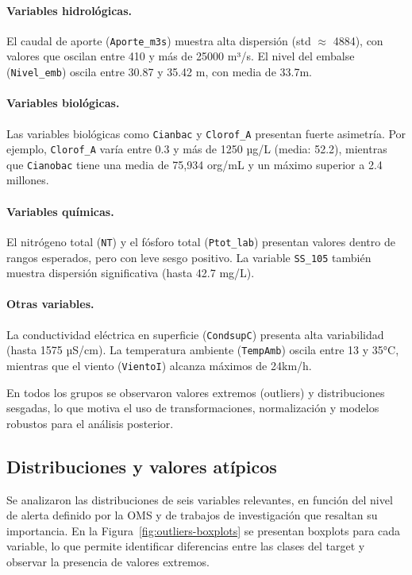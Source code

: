 \documentclass[
  11pt,
  pdftitle=TFI - Tschopp Joaquín S.,
  pdfauthor=Tschopp Joaquín S.,
  pdfcreator=LaTeX with hyperref,
]{report}  %
\begin{document}
\paragraph{Variables hidrológicas.}
El caudal de aporte (\texttt{Aporte\_m3s}) muestra alta dispersión (std $\approx$ 4884), con valores que oscilan entre 410 y más de 25000 m³/s. El nivel del embalse (\texttt{Nivel\_emb}) oscila entre 30.87 y 35.42 m, con media de 33.7m.

\paragraph{Variables biológicas.}
Las variables biológicas como \texttt{Cianbac} y \texttt{Clorof\_A} presentan fuerte asimetría. Por ejemplo, \texttt{Clorof\_A} varía entre 0.3 y más de 1250 µg/L (media: 52.2), mientras que \texttt{Cianobac} tiene una media de 75,934 org/mL y un máximo superior a 2.4 millones.

\paragraph{Variables químicas.}
El nitrógeno total (\texttt{NT}) y el fósforo total (\texttt{Ptot\_lab}) presentan valores dentro de rangos esperados, pero con leve sesgo positivo. La variable \texttt{SS\_105} también muestra dispersión significativa (hasta 42.7 mg/L).

\paragraph{Otras variables.}
La conductividad eléctrica en superficie (\texttt{CondsupC}) presenta alta variabilidad (hasta 1575 µS/cm). La temperatura ambiente (\texttt{TempAmb}) oscila entre 13 y 35°C, mientras que el viento (\texttt{VientoI}) alcanza máximos de 24km/h.

En todos los grupos se observaron valores extremos (outliers) y distribuciones sesgadas, lo que motiva el uso de transformaciones, normalización y modelos robustos para el análisis posterior.

\subsection{Distribuciones y valores atípicos}

Se analizaron las distribuciones de seis variables relevantes, en función del nivel de alerta definido por la OMS y de trabajos de investigación que resaltan su importancia. En la Figura~\ref{fig:outliers-boxplots} se presentan boxplots para cada variable, lo que permite identificar diferencias entre las clases del target y observar la presencia de valores extremos.
\end{document}
